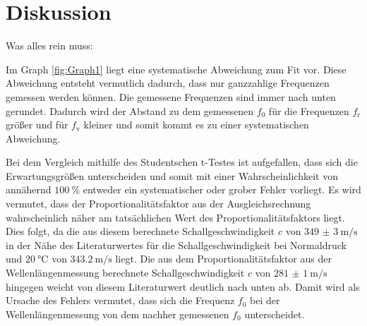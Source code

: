 
\section{Diskussion}
\label{sec:Diskussion}

Was alles rein muss:
	

Im Graph \ref{fig:Graph1} liegt eine systematische Abweichung zum Fit vor. Diese Abweichung entsteht vermutlich dadurch, dass nur ganzzahlige Frequenzen gemessen werden können. Die gemessene Frequenzen sind immer nach unten gerundet. Dadurch wird der Abstand zu dem gemessenen $f_0$ für die Frequenzen $f_\text{r}$ größer und für $f_\text{v}$ kleiner und somit kommt es zu einer systematischen Abweichung.


Bei dem Vergleich mithilfe des Studentschen t-Testes ist aufgefallen, dass sich die Erwartungsgrößen unterscheiden und somit mit einer Wahrscheinlichkeit von annähernd $\SI{100}{\percent}$ entweder ein systematischer oder grober Fehler vorliegt. Es wird vermutet, dass der Proportionalitätsfaktor aus der Ausgleichsrechnung wahrscheinlich näher am tatsächlichen Wert des Proportionalitätsfaktors liegt. Dies folgt, da die aus diesem berechnete Schallgeschwindigkeit $c$ von $\SI{349(3)}{\meter\per\second}$ in der Nähe des Literaturwertes für die Schallgeschwindigkeit bei Normaldruck und $\SI{20}{\celsius}$ von $\SI{343.2}{\meter\per\second}$ \cite{c} liegt. Die aus dem Proportionalitätsfaktor aus der Wellenlängenmessung berechnete Schallgeschwindigkeit $c$ von $\SI{281(1)}{\meter\per\second}$ hingegen weicht von diesem Literaturwert deutlich nach unten ab. Damit wird als Ursache des Fehlers vermutet, dass sich die Frequenz $f_0$ bei der Wellenlängenmessung von dem nachher gemessenen $f_0$ unterscheidet. 